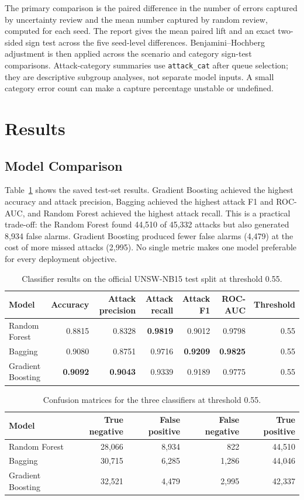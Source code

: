 \documentclass[conference]{IEEEtran}
\begin{document}
The primary comparison is the paired difference in the number of errors captured by uncertainty review and the mean number captured by random review, computed for each seed. The report gives the mean paired lift and an exact two-sided sign test across the five seed-level differences. Benjamini--Hochberg adjustment is then applied across the scenario and category sign-test comparisons. Attack-category summaries use \texttt{attack\_cat} after queue selection; they are descriptive subgroup analyses, not separate model inputs. A small category error count can make a capture percentage unstable or undefined.

\section{Results}
\subsection{Model Comparison}
Table~\ref{tab:model_metrics} shows the saved test-set results. Gradient Boosting achieved the highest accuracy and attack precision, Bagging achieved the highest attack F1 and ROC-AUC, and Random Forest achieved the highest attack recall. This is a practical trade-off: the Random Forest found 44,510 of 45,332 attacks but also generated 8,934 false alarms. Gradient Boosting produced fewer false alarms (4,479) at the cost of more missed attacks (2,995). No single metric makes one model preferable for every deployment objective.

\begin{table}[t]
\caption{Classifier results on the official UNSW-NB15 test split at threshold 0.55.}
\label{tab:model_metrics}
\centering
\small
\begin{tabular}{lrrrrrr}
\toprule
Model & Accuracy & Attack precision & Attack recall & Attack F1 & ROC-AUC & Threshold \\
\midrule
Random Forest & 0.8815 & 0.8328 & \textbf{0.9819} & 0.9012 & 0.9798 & 0.55 \\
Bagging & 0.9080 & 0.8751 & 0.9716 & \textbf{0.9209} & \textbf{0.9825} & 0.55 \\
Gradient Boosting & \textbf{0.9092} & \textbf{0.9043} & 0.9339 & 0.9189 & 0.9775 & 0.55 \\
\bottomrule
\end{tabular}
\end{table}

\begin{table}[t]
\caption{Confusion matrices for the three classifiers at threshold 0.55.}
\label{tab:confusions}
\centering
\small
\begin{tabular}{lrrrr}
\toprule
Model & True negative & False positive & False negative & True positive \\
\midrule
Random Forest & 28,066 & 8,934 & 822 & 44,510 \\
Bagging & 30,715 & 6,285 & 1,286 & 44,046 \\
Gradient Boosting & 32,521 & 4,479 & 2,995 & 42,337 \\
\bottomrule
\end{tabular}
\end{table}
\end{document}
